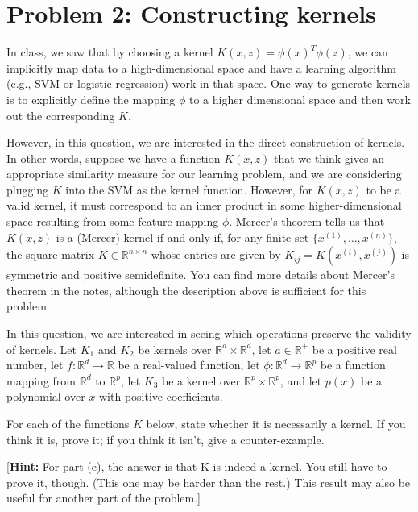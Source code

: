 \documentclass{article}
\begin{document}


\section*{Problem 2: Constructing kernels}

In class, we saw that by choosing a kernel $K(x, z) = \phi(x)^T \phi(z)$, we can implicitly map data to
a high-dimensional space and have a learning algorithm (e.g., SVM or logistic regression) work
in that space. One way to generate kernels is to explicitly define the mapping $\phi$ to a higher
dimensional space and then work out the corresponding $K$.

However, in this question, we are interested in the direct construction of kernels. In other words, suppose we
have a function $K(x, z)$ that we think gives an appropriate similarity measure for our learning
problem, and we are considering plugging $K$ into the SVM as the kernel function. However, for
$K(x, z)$ to be a valid kernel, it must correspond to an inner product in some higher-dimensional
space resulting from some feature mapping $\phi$. Mercer's theorem tells us that $K(x, z)$ is a (Mercer)
kernel if and only if, for any finite set $\{x^{(1)}, \ldots, x^{(n)}\}$, the square matrix $K \in \mathbb{R}^{n \times n}$ whose entries
are given by $K_{ij} = K(x^{(i)}, x^{(j)})$ is symmetric and positive semidefinite. You can find more details
about Mercer's theorem in the notes, although the description above is sufficient for this problem.

In this question, we are interested in seeing which operations preserve the validity of kernels.
Let $K_1$ and $K_2$ be kernels over $\mathbb{R}^d \times \mathbb{R}^d$, let $a \in \mathbb{R}^+$ be a positive real number, let $f : \mathbb{R}^d \rightarrow \mathbb{R}$ be a
real-valued function, let $\phi : \mathbb{R}^d \rightarrow \mathbb{R}^p$ be a function mapping from $\mathbb{R}^d$ to $\mathbb{R}^p$, let $K_3$ be a kernel
over $\mathbb{R}^p \times \mathbb{R}^p$, and let $p(x)$ be a polynomial over $x$ with positive coefficients.

For each of the functions $K$ below, state whether it is necessarily a kernel. If you think it is,
prove it; if you think it isn't, give a counter-example.

[\textbf{Hint:} For part (e), the answer is that K is indeed a kernel. You still have to prove it, though.
(This one may be harder than the rest.) This result may also be useful for another part of the
problem.]
\end{document}
